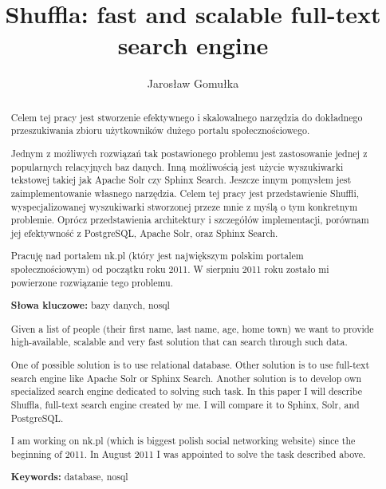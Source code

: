 \documentclass[10pt,a4paper]{article}
\begin{document}
\normalsize

\restoregeometry

\newpage
\thispagestyle{empty}

\begin{abstract}
Celem tej pracy jest stworzenie efektywnego i skalowalnego narzędzia do dokładnego przeszukiwania zbioru użytkowników dużego portalu społecznościowego. 

Jednym z możliwych rozwiązań tak postawionego problemu jest zastosowanie jednej z popularnych relacyjnych baz danych. Inną możliwością jest użycie wyszukiwarki tekstowej takiej jak Apache Solr czy Sphinx Search. Jeszcze innym pomysłem jest zaimplementowanie własnego narzędzia. Celem tej pracy jest przedstawienie Shuffli, wyspecjalizowanej wyszukiwarki stworzonej przeze mnie z myślą o tym konkretnym problemie. Oprócz przedstawienia architektury i szczegółów implementacji, porównam jej efektywność z PostgreSQL, Apache Solr, oraz Sphinx Search.

\bigskip
Pracuję nad portalem nk.pl (który jest największym polskim portalem społecznościowym) od początku roku 2011. W sierpniu 2011 roku zostało mi powierzone rozwiązanie tego problemu.

\bigskip
\noindent \textbf{Słowa kluczowe:} bazy danych, nosql
\end{abstract}



\title{Shuffla: fast and scalable full-text search engine}
\author{Jarosław Gomułka}

\maketitle

\begin{abstract}
Given a list of people (their first name, last name, age, home town) we want to provide high-available, scalable and very fast solution that can search through such data.

\bigskip
One of possible solution is to use relational database. Other solution is to use full-text search engine like Apache Solr or Sphinx Search. Another solution is to develop own specialized search engine dedicated to solving such task. In this paper I will describe Shuffla, full-text search engine created by me. I will compare it to Sphinx, Solr, and PostgreSQL. 

\bigskip
I am working on nk.pl (which is biggest polish social networking website) since the beginning of 2011. In August 2011 I was appointed to solve the task described above. 

\bigskip
\noindent \textbf{Keywords:} database, nosql
\end{abstract}
\end{document}
